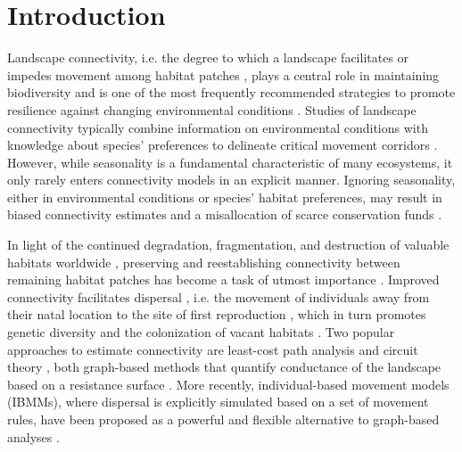 \documentclass[abstract=on,10pt,a4paper,bibliography=totocnumbered]{article}
\begin{document}
\newpage

\onehalfspacing
\tableofcontents
\doublespacing

\newpage
{}

\section{Introduction}

Landscape connectivity, i.e. the degree to which a landscape facilitates or
impedes movement among habitat patches \citep{Taylor.1993}, plays a central role
in maintaining biodiversity \citep{Fahrig.2003} and is one of the most
frequently recommended strategies to promote resilience against changing
environmental conditions \citep{Heller.2009, Rudnick.2012}. Studies of landscape
connectivity typically combine information on environmental conditions with
knowledge about species' preferences to delineate critical movement corridors
\citep{Beier.2008, Diniz.2019}. However, while seasonality is a fundamental
characteristic of many ecosystems, it only rarely enters connectivity models in
an explicit manner. Ignoring seasonality, either in environmental conditions or
species' habitat preferences, may result in biased connectivity estimates and a
misallocation of scarce conservation funds \citep{Osipova.2019, Zeller.2020}.

In light of the continued degradation, fragmentation, and destruction of
valuable habitats worldwide \citep{Fahrig.2003, Haddad.2015}, preserving and
reestablishing connectivity between remaining habitat patches has become a task
of utmost importance \citep{Heller.2009, Rudnick.2012}. Improved connectivity
facilitates dispersal \citep{Doerr.2011, Baguette.2013}, i.e. the movement of
individuals away from their natal location to the site of first reproduction
\citep{Clobert.2012}, which in turn promotes genetic diversity
\citep{Perrin.2000, Frankham.2002} and the colonization of vacant habitats
\citep{Hanski.1999, MacArthur.2001}. Two popular approaches to estimate
connectivity are least-cost path analysis \citep{Adriaensen.2003} and circuit
theory \citep{McRae.2008}, both graph-based methods that quantify conductance of
the landscape based on a resistance surface \citep{Zeller.2012, Diniz.2019}.
More recently, individual-based movement models (IBMMs), where dispersal is
explicitly simulated based on a set of movement rules, have been proposed as a
powerful and flexible alternative to graph-based analyses \citep{Kanagaraj.2013,
Allen.2016, Hauenstein.2019, Diniz.2019, Zeller.2020, UnnithanKumar.2022a,
UnnithanKumar.2022, Hofmann.2023}.
\end{document}

